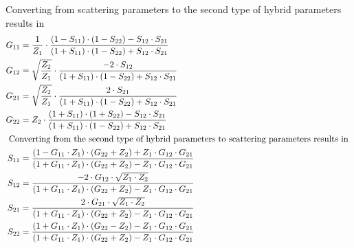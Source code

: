 Converting from scattering parameters to the second type of hybrid
parameters results in
\begin{align}
G_{11} &= \dfrac{1}{Z_{1}}\cdot \dfrac{\left(1 - S_{11}\right)\cdot \left(1 - S_{22}\right) - S_{12}\cdot S_{21}}{\left(1 + S_{11}\right)\cdot \left(1 - S_{22}\right) + S_{12}\cdot S_{21}}\\
G_{12} &= \sqrt{\dfrac{Z_2}{Z_1}}\cdot \dfrac{-2\cdot S_{12}}{\left(1 + S_{11}\right)\cdot \left(1 - S_{22}\right) + S_{12}\cdot S_{21}}\\
G_{21} &= \sqrt{\dfrac{Z_2}{Z_1}}\cdot \dfrac{2\cdot S_{21}}{\left(1 + S_{11}\right)\cdot \left(1 - S_{22}\right) + S_{12}\cdot S_{21}}\\
G_{22} &= Z_{2}\cdot \dfrac{\left(1 + S_{11}\right)\cdot \left(1 + S_{22}\right) - S_{12}\cdot S_{21}}{\left(1 + S_{11}\right)\cdot \left(1 - S_{22}\right) + S_{12}\cdot S_{21}}\\
\intertext{
Converting from the second type of hybrid parameters to scattering
parameters results in
}
S_{11} &= \dfrac{\left(1 - G_{11}\cdot Z_{1}\right)\cdot \left(G_{22} + Z_{2}\right) + Z_1\cdot G_{12}\cdot G_{21}}{\left(1 + G_{11}\cdot Z_{1}\right)\cdot \left(G_{22} + Z_{2}\right) - Z_1\cdot G_{12}\cdot G_{21}}\\
S_{12} &= \dfrac{-2\cdot G_{12}\cdot\sqrt{Z_1\cdot Z_2}}{\left(1 + G_{11} \cdot Z_{1}\right)\cdot \left(G_{22} + Z_{2}\right) - Z_1\cdot G_{12}\cdot G_{21}}\\
S_{21} &= \dfrac{2\cdot G_{21}\cdot\sqrt{Z_1\cdot Z_2}}{\left(1 + G_{11} \cdot Z_{1}\right)\cdot \left(G_{22} + Z_{2}\right) - Z_1\cdot G_{12}\cdot G_{21}}\\
S_{22} &= \dfrac{\left(1 + G_{11} \cdot Z_{1}\right)\cdot \left(G_{22} - Z_{2}\right) - Z_1\cdot G_{12}\cdot G_{21}}{\left(1 + G_{11} \cdot Z_{1}\right)\cdot \left(G_{22} + Z_{2}\right) - Z_1\cdot G_{12}\cdot G_{21}}
\end{align}

